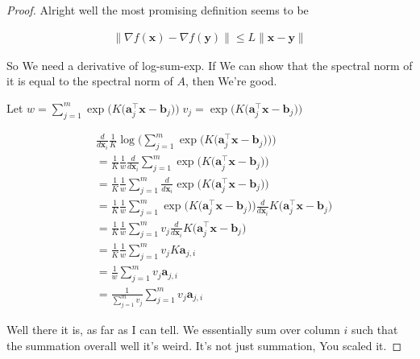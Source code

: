 \documentclass{article}
\begin{document}
\begin{proof}
	Alright well the most promising definition seems to be
	
	\begin{align}
		\|\nabla f(\mathbf{x}) - \nabla f(\mathbf{y})\| \le L\|\mathbf{x}-\mathbf{y}\|
	\end{align}
	
	So We need a derivative of log-sum-exp. If We can show that the spectral norm of it is equal to the spectral norm of $A$, then We're good. 
	
	Let $w = \sum^m_{j=1}\exp\big(K\big( \mathbf{a}_j^\top\mathbf{x} - \mathbf{b}_j\big) \big)\;v_j=\exp\big(K\big( \mathbf{a}_j^\top\mathbf{x} - \mathbf{b}_j\big) \big)$
	
	\begin{align}
		&\frac{d}{d\mathbf{x}_i}  \frac{1}{K}\log\bigg( \sum^m_{j=1}\exp\big(K\big( \mathbf{a}_j^\top\mathbf{x} - \mathbf{b}_j\big) \big) \bigg)\\
		&= \frac{1}{K} \frac{1}{w}\frac{d}{d\mathbf{x}_i} \sum^m_{j=1}\exp\big(K\big( \mathbf{a}_j^\top\mathbf{x} - \mathbf{b}_j\big) \big)\\
		&= \frac{1}{K} \frac{1}{w} \sum^m_{j=1} \frac{d}{d\mathbf{x}_i} \exp\big(K\big( \mathbf{a}_j^\top\mathbf{x} - \mathbf{b}_j\big) \big)\\
		&= \frac{1}{K} \frac{1}{w} \sum^m_{j=1}  \exp\big(K\big( \mathbf{a}_j^\top\mathbf{x} - \mathbf{b}_j\big) \big)\frac{d}{d\mathbf{x}_i} K\big( \mathbf{a}_j^\top\mathbf{x} - \mathbf{b}_j\big)\\
	&= \frac{1}{K} \frac{1}{w} \sum^m_{j=1} v_j \frac{d}{d\mathbf{x}_i}K\big( \mathbf{a}_j^\top\mathbf{x} - \mathbf{b}_j\big)\\
	&= \frac{1}{K} \frac{1}{w} \sum^m_{j=1} v_j K\mathbf{a}_{j,i}\\
	&=  \frac{1}{w} \sum^m_{j=1} v_j \mathbf{a}_{j,i}\\
	&=  \frac{1}{\sum^m_{j=1} v_j} \sum^m_{j=1} v_j \mathbf{a}_{j,i}
	\end{align}
	
	Well there it is, as far as I can tell. We essentially sum over column $i$ such that the summation overall well it's weird. It's not just summation, You scaled it. 
	
	
	
	
	
	
	
	
	
	
	
	
\end{proof}
	
	
	
	
	
	
	
	
	
	














	
\end{document}
